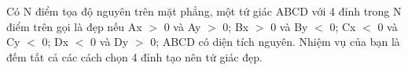 Có N điểm tọa độ nguyên trên mặt phẳng, một tứ giác ABCD với 4 đỉnh trong N điểm trên gọi là đẹp nếu     Ax $>$ 0 và Ay $>$ 0;     Bx $>$ 0 và By $<$ 0;     Cx $<$ 0 và Cy $<$ 0;     Dx $<$ 0 và Dy $>$ 0;     ABCD có diện tích nguyên. Nhiệm vụ của bạn là đếm tất cả các cách chọn 4 đỉnh tạo nên tứ giác đẹp.  

\